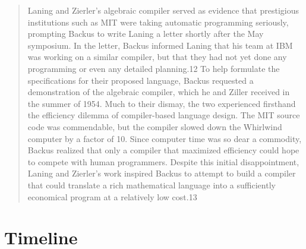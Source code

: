 \begin{quotation}
Laning and Zierler's algebraic compiler served as evidence that prestigious 
institutions such as MIT were taking automatic programming seriously, prompting 
Backus to write Laning a letter shortly after the May symposium. In the letter, 
Backus informed Laning that his team at IBM was working on a similar compiler, 
but that they had not yet done any programming or even any detailed planning.12 
To help formulate the specifications for their proposed language, Backus 
requested a demonstration of the algebraic compiler, which he and Ziller 
received in the summer of 1954. Much to their dismay, the two experienced firsthand the efficiency dilemma of compiler-based language design. The MIT 
source code was commendable, but the compiler slowed down the Whirlwind 
computer by a factor of 10. Since computer time was so dear a commodity, Backus 
realized that only a compiler that maximized efficiency could hope to compete 
with human programmers. Despite this initial disappointment, Laning and 
Zierler's work inspired Backus to attempt to build a compiler that could 
translate a rich mathematical language into a sufficiently economical program 
at a relatively low cost.13
\cite{grace_hopper_and_the_invention_of_the_information_age_2009}
\end{quotation}

\pagebreak
\section{Timeline}

